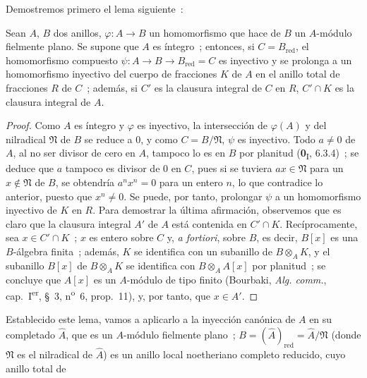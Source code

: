 Demostremos primero el lema siguiente~:

\begin{lemma}[23.2.7.1]
\label{0.23.2.7.1-es}
Sean $A$, $B$ dos anillos, $\varphi:A\to B$ un homomorfismo que hace de $B$
un $A$-módulo fielmente plano. Se supone que $A$ es íntegro~; entonces, si
$C=B_{\mathrm{red}}$, el homomorfismo compuesto
$\psi:A\to B\to B_{\mathrm{red}}=C$ es inyectivo y se prolonga a un
homomorfismo inyectivo del cuerpo de fracciones $K$ de $A$ en el anillo total
de fracciones $R$ de $C$~; además, si $C'$ es la clausura integral de
$C$ en $R$, $C'\cap K$ es la clausura integral de $A$.
\end{lemma}

\begin{proof}
Como $A$ es íntegro y $\varphi$ es inyectivo, la intersección de $\varphi(A)$
y del nilradical $\mathfrak N$ de $B$ se reduce a $0$, y como
$C=B/\mathfrak N$, $\psi$ es inyectivo. Todo $a\neq0$ de $A$, al no ser
divisor de cero en $A$, tampoco lo es en $B$ por planitud
(\textbf{0}\textsubscript{I}, 6.3.4)~; se deduce que $a$ tampoco es divisor
de $0$ en $C$, pues si se tuviera $ax\in\mathfrak N$ para un
$x\notin\mathfrak N$ de $B$, se obtendría $a^nx^n=0$ para un entero $n$,
lo que contradice lo anterior, puesto que $x^n\neq0$. Se puede, por tanto, prolongar
$\psi$ a un homomorfismo inyectivo de $K$ en $R$. Para demostrar la última
afirmación, observemos que es claro que la clausura integral $A'$ de $A$ está
contenida en $C'\cap K$. Recíprocamente, sea $x\in C'\cap K$~; $x$ es
entero sobre $C$ y, \emph{a fortiori}, sobre $B$, es decir, $B[x]$ es una
$B$-álgebra finita~; además, $K$ se identifica con un subanillo de
$B\otimes_AK$, y el subanillo $B[x]$ de $B\otimes_AK$ se identifica con
$B\otimes_AA[x]$ por planitud~; se concluye que $A[x]$ es un $A$-módulo
de tipo finito (Bourbaki, \emph{Alg. comm.}, cap.~I\textsuperscript{er}, §~3,
n\textsuperscript{o}~6, prop.~11), y, por tanto, que $x\in A'$.
\end{proof}

Establecido este lema, vamos a aplicarlo a la inyección canónica de $A$
en su completado $\widehat A$, que es un $A$-módulo fielmente plano~;
$B=(\widehat A)_{\mathrm{red}}=\widehat A/\mathfrak N$ (donde $\mathfrak N$ es
el nilradical de $\widehat A$) es un anillo local noetheriano completo reducido,
cuyo anillo total de


